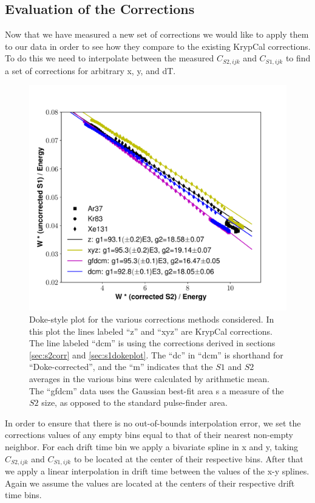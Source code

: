 {\subsection{Evaluation of the Corrections}\label{sec:appcorr}
Now that we have measured a new set of corrections we would like to apply them to our data in order to see how they compare to the existing KrypCal corrections. To do this we need to interpolate between the measured $C_{S2,ijk}$ and $C_{S1,ijk}$ to find a set of corrections for arbitrary x, y, and dT.
\begin{figure}[h!]
\centering
\includegraphics[width=150mm]{Figures/dt_doke_plot.pdf}
\caption{Doke-style plot for the various corrections methods considered. In this plot the lines labeled ``z'' and ``xyz'' are KrypCal corrections. The line labeled ``dcm'' is using the corrections derived in sections \ref{sec:s2corr} and \ref{sec:s1dokeplot}. The ``dc'' in ``dcm'' is shorthand for ``Doke-corrected'', and the ``m'' indicates that the $S1$ and $S2$ averages in the various bins were calculated by arithmetic mean. The ``gfdcm'' data uses the Gaussian best-fit area s a measure of the $S2$ size, as opposed to the standard pulse-finder area.}
\label{fig:dt_doke_plot} 
\end{figure}

In order to ensure that there is no out-of-bounds interpolation error, we set the corrections values of any empty bins equal to that of their nearest non-empty neighbor. For each drift time bin we apply a bivariate spline in x and y, taking $C_{S2,ijk}$ and $C_{S1,ijk}$ to be located at the center of their respective bins. After that we apply a linear interpolation in drift time between the values of the x-y splines. Again we assume the values are located at the centers of their respective drift time bins.

}
